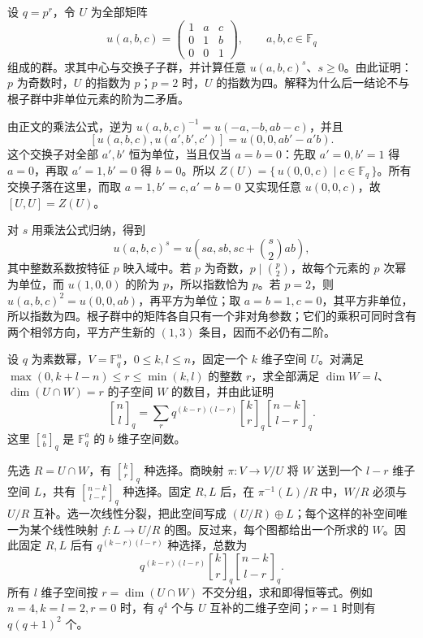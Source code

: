 \begin{exercise}\label{b5:ex:F-upper-three-exponent}
	设 \(q=p^r\)，令 \(U\) 为全部矩阵
	\[
		u(a,b,c)=\begin{pmatrix}1&a&c\\0&1&b\\0&0&1\end{pmatrix},\qquad a,b,c\in\mathbb F_q
	\]
	组成的群。求其中心与交换子子群，并计算任意 \(u(a,b,c)^s\)、\(s\ge0\)。由此证明：\(p\) 为奇数时，\(U\) 的指数为 \(p\)；\(p=2\) 时，\(U\) 的指数为四。解释为什么后一结论不与根子群中非单位元素的阶为二矛盾。
\end{exercise}
\begin{solution}
	由正文的乘法公式，逆为 \(u(a,b,c)^{-1}=u(-a,-b,ab-c)\)，并且
	\[
		[u(a,b,c),u(a',b',c')]=u(0,0,ab'-a'b).
	\]
	这个交换子对全部 \(a',b'\) 恒为单位，当且仅当 \(a=b=0\)：先取 \(a'=0,b'=1\) 得 \(a=0\)，再取 \(a'=1,b'=0\) 得 \(b=0\)。所以 \(Z(U)=\{\,u(0,0,c)\mid c\in\mathbb F_q\,\}\)。所有交换子落在这里，而取 \(a=1,b'=c,a'=b=0\) 又实现任意 \(u(0,0,c)\)，故 \([U,U]=Z(U)\)。

	对 \(s\) 用乘法公式归纳，得到
	\[
		u(a,b,c)^s=u\left(sa,sb,sc+\binom{s}{2}ab\right),
	\]
	其中整数系数按特征 \(p\) 映入域中。若 \(p\) 为奇数，\(p\mid\binom p2\)，故每个元素的 \(p\) 次幂为单位，而 \(u(1,0,0)\) 的阶为 \(p\)，所以指数恰为 \(p\)。若 \(p=2\)，则 \(u(a,b,c)^2=u(0,0,ab)\)，再平方为单位；取 \(a=b=1,c=0\)，其平方非单位，所以指数为四。根子群中的矩阵各自只有一个非对角参数；它们的乘积可同时含有两个相邻方向，平方产生新的 \((1,3)\) 条目，因而不必仍有二阶。
\end{solution}

\begin{exercise}\label{b5:ex:F-Grassmann-orbit-size}
	设 \(q\) 为素数幂，\(V=\mathbb F_q^n\)，\(0\le k,l\le n\)，固定一个 \(k\) 维子空间 \(U\)。对满足 \(\max(0,k+l-n)\le r\le\min(k,l)\) 的整数 \(r\)，求全部满足 \(\dim W=l\)、\(\dim(U\cap W)=r\) 的子空间 \(W\) 的数目，并由此证明
	\[
		{n\brack l}_q=
		\sum_r q^{(k-r)(l-r)}{k\brack r}_q{n-k\brack l-r}_q.
	\]
	这里 \({a\brack b}_q\) 是 \(\mathbb F_q^a\) 的 \(b\) 维子空间数。
\end{exercise}
\begin{solution}
	先选 \(R=U\cap W\)，有 \({k\brack r}_q\) 种选择。商映射 \(\pi:V\to V/U\) 将 \(W\) 送到一个 \(l-r\) 维子空间 \(L\)，共有 \({n-k\brack l-r}_q\) 种选择。固定 \(R,L\) 后，在 \(\pi^{-1}(L)/R\) 中，\(W/R\) 必须与 \(U/R\) 互补。选一次线性分裂，把此空间写成 \((U/R)\oplus L\)；每个这样的补空间唯一为某个线性映射 \(f:L\to U/R\) 的图。反过来，每个图都给出一个所求的 \(W\)。因此固定 \(R,L\) 后有 \(q^{(k-r)(l-r)}\) 种选择，总数为
	\[
		q^{(k-r)(l-r)}{k\brack r}_q{n-k\brack l-r}_q.
	\]
	所有 \(l\) 维子空间按 \(r=\dim(U\cap W)\) 不交分组，求和即得恒等式。例如 \(n=4,k=l=2,r=0\) 时，有 \(q^4\) 个与 \(U\) 互补的二维子空间；\(r=1\) 时则有 \(q(q+1)^2\) 个。
\end{solution}

